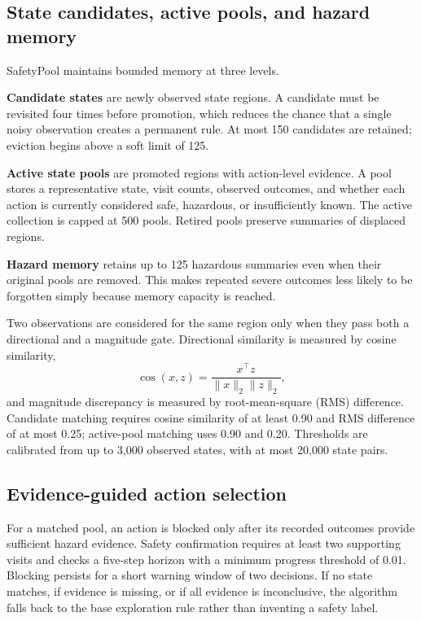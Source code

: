 \documentclass[runningheads]{llncs}
\begin{document}
\subsection{State candidates, active pools, and hazard memory}

SafetyPool maintains bounded memory at three levels.

\textbf{Candidate states} are newly observed state regions. A candidate must be revisited four times before promotion, which reduces the chance that a single noisy observation creates a permanent rule. At most 150 candidates are retained; eviction begins above a soft limit of 125.

\textbf{Active state pools} are promoted regions with action-level evidence. A pool stores a representative state, visit counts, observed outcomes, and whether each action is currently considered safe, hazardous, or insufficiently known. The active collection is capped at 500 pools. Retired pools preserve summaries of displaced regions.

\textbf{Hazard memory} retains up to 125 hazardous summaries even when their original pools are removed. This makes repeated severe outcomes less likely to be forgotten simply because memory capacity is reached.

Two observations are considered for the same region only when they pass both a directional and a magnitude gate. Directional similarity is measured by cosine similarity,
\begin{equation}
\operatorname{cos}(x,z)=\frac{x^\top z}{\lVert x\rVert_2\lVert z\rVert_2},
\end{equation}
and magnitude discrepancy is measured by root-mean-square (RMS) difference. Candidate matching requires cosine similarity of at least 0.90 and RMS difference of at most 0.25; active-pool matching uses 0.90 and 0.20. Thresholds are calibrated from up to 3,000 observed states, with at most 20,000 state pairs.

\subsection{Evidence-guided action selection}

For a matched pool, an action is blocked only after its recorded outcomes provide sufficient hazard evidence. Safety confirmation requires at least two supporting visits and checks a five-step horizon with a minimum progress threshold of 0.01. Blocking persists for a short warning window of two decisions. If no state matches, if evidence is missing, or if all evidence is inconclusive, the algorithm falls back to the base exploration rule rather than inventing a safety label.
\end{document}
